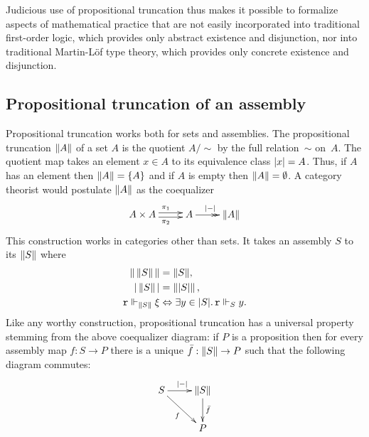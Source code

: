 Judicious use of propositional truncation thus makes it possible to formalize aspects of mathematical practice that are not easily incorporated into traditional first-order logic, which provides only abstract existence and disjunction, nor into traditional Martin-Löf type theory, which provides only concrete existence and disjunction.

\subsection{Propositional truncation of an assembly}
\label{sec:prop-trunc-asm}

Propositional truncation works both for sets and assemblies. The propositional truncation $\Trunc{A}$ of a set $A$ is the quotient $A/{\sim}$ by the full relation~$\sim$ on~$A$.
%
The quotient map takes an element $x \in A$ to its equivalence class $\trunc{x} = A$.
%
Thus, if $A$ has an element then $\Trunc{A} = \set{A}$ and if $A$ is empty then $\Trunc{A} = \emptyset$.
%
A category theorist would postulate $\Trunc{A}$ as the coequalizer
%
\begin{equation*}
  \xymatrix{
    {A \times A}
    \ar@<0.5ex>[r]^{\pi_1}
    \ar@<-0.5ex>[r]_{\pi_2}
    &
    {A}
    \ar@{->>}[r]^{\trunc{{-}}}
    &
    {\Trunc{A}}
  }
\end{equation*}
%
This construction works in categories other than sets. It takes an assembly $S$ to its  $\Trunc{S}$ where
%
\begin{align*}
  \T{\Trunc{S}} &= \T{S}, \\
  \S{\Trunc{S}} &= \Trunc{\S{S}}, \\
  \R{r} \rz[\Trunc{S}] \xi
  &\liff
    \some{y \in \S{S}} \R{r} \rz[S] y.
\end{align*}
%
Like any worthy construction, propositional truncation has a universal property stemming from the above coequalizer diagram: if $P$ is a proposition then for every assembly map $f : S \to P$ there is a unique $\bar{f} : \Trunc{S} \to P$ such that the following diagram commutes:
%
\begin{equation*}
  \xymatrix{
    {S}
    \ar[r]^{\trunc{{-}}}
    \ar[rd]_{f}
    &
    {\Trunc{S}}
    \ar[d]^{\bar{f}}
    \\
    &
    {P}
  }
\end{equation*}

